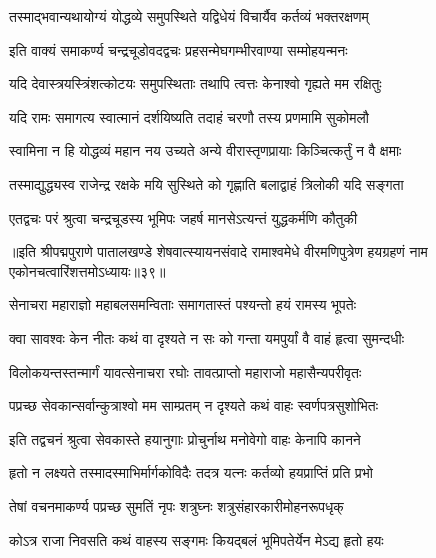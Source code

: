 \twolineshloka
{तस्माद्भवान्यथायोग्यं योद्धव्ये समुपस्थिते}
{यद्विधेयं विचार्यैव कर्तव्यं भक्तरक्षणम्}%


\twolineshloka
{इति वाक्यं समाकर्ण्य चन्द्रचूडोवदद्वचः}
{प्रहसन्मेघगम्भीरवाण्या सम्मोहयन्मनः}%

\twolineshloka
{यदि देवास्त्रयस्त्रिंशत्कोटयः समुपस्थिताः}
{तथापि त्वत्तः केनाश्वो गृह्यते मम रक्षितुः}%

\twolineshloka
{यदि रामः समागत्य स्वात्मानं दर्शयिष्यति}
{तदाहं चरणौ तस्य प्रणमामि सुकोमलौ}%

\twolineshloka
{स्वामिना न हि योद्धव्यं महान नय उच्यते}
{अन्ये वीरास्तृणप्रायाः किञ्चित्कर्तुं न वै क्षमाः}%

\twolineshloka
{तस्माद्युद्ध्यस्व राजेन्द्र रक्षके मयि सुस्थिते}
{को गृह्णाति बलाद्वाहं त्रिलोकी यदि सङ्गता}%


\twolineshloka
{एतद्वचः परं श्रुत्वा चन्द्रचूडस्य भूमिपः}
{जहर्ष मानसेऽत्यन्तं युद्धकर्मणि कौतुकी}%

{॥इति श्रीपद्मपुराणे पातालखण्डे शेषवात्स्यायनसंवादे रामाश्वमेधे वीरमणिपुत्रेण हयग्रहणं नाम एकोनचत्वारिंशत्तमोऽध्यायः॥३९॥}



\twolineshloka
{सेनाचरा महाराज्ञो महाबलसमन्विताः}
{समागतास्तं पश्यन्तो हयं रामस्य भूपतेः}%

\twolineshloka
{क्वा सावश्वः केन नीतः कथं वा दृश्यते न सः}
{को गन्ता यमपुर्यां वै वाहं हृत्वा सुमन्दधीः}%

\twolineshloka
{विलोकयन्तस्तन्मार्गं यावत्सेनाचरा रघोः}
{तावत्प्राप्तो महाराजो महासैन्यपरीवृतः}%

\twolineshloka
{पप्रच्छ सेवकान्सर्वान्कुत्राश्वो मम साम्प्रतम्}
{न दृश्यते कथं वाहः स्वर्णपत्रसुशोभितः}%

\twolineshloka
{इति तद्वचनं श्रुत्वा सेवकास्ते हयानुगाः}
{प्रोचुर्नाथ मनोवेगो वाहः केनापि कानने}%

\twolineshloka
{हृतो न लक्ष्यते तस्मादस्माभिर्मार्गकोविदैः}
{तदत्र यत्नः कर्तव्यो हयप्राप्तिं प्रति प्रभो}%

\twolineshloka
{तेषां वचनमाकर्ण्य पप्रच्छ सुमतिं नृपः}
{शत्रुघ्नः शत्रुसंहारकारीमोहनरूपधृक्}%


\twolineshloka
{कोऽत्र राजा निवसति कथं वाहस्य सङ्गमः}
{कियद्बलं भूमिपतेर्येन मेऽद्य हृतो हयः}%

